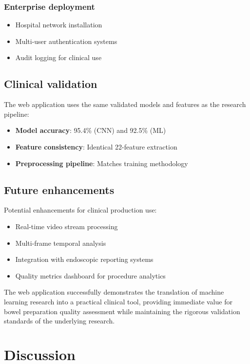 \documentclass[11pt]{article}
\begin{document}
\subsubsection{Enterprise deployment}
\begin{itemize}
    \item Hospital network installation
    \item Multi-user authentication systems
    \item Audit logging for clinical use
\end{itemize}

\subsection{Clinical validation}

The web application uses the same validated models and features as the research pipeline:

\begin{itemize}
    \item \textbf{Model accuracy}: 95.4\% (CNN) and 92.5\% (ML)
    \item \textbf{Feature consistency}: Identical 22-feature extraction
    \item \textbf{Preprocessing pipeline}: Matches training methodology
\end{itemize}

\subsection{Future enhancements}

Potential enhancements for clinical production use:

\begin{itemize}
    \item Real-time video stream processing
    \item Multi-frame temporal analysis
    \item Integration with endoscopic reporting systems
    \item Quality metrics dashboard for procedure analytics
\end{itemize}

The web application successfully demonstrates the translation of machine learning research into a practical clinical tool, providing immediate value for bowel preparation quality assessment while maintaining the rigorous validation standards of the underlying research.

\section{Discussion}
\end{document}
